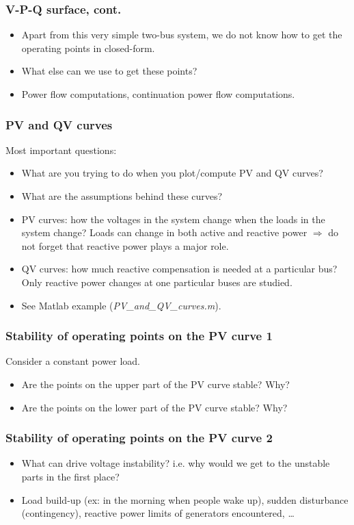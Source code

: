 \documentclass{beamer}
\newlength\fheight
\newlength\fwidth
\begin{document}
\begin{frame}
  \frametitle{V-P-Q surface, cont.}
  \begin{itemize}
  \item Apart from this very simple two-bus system, we do not know how to get the operating points in closed-form. 
  \item What else can we use to get these points?
  \item<visible@2-> Power flow computations, continuation power flow computations.
  \end{itemize}
\end{frame}

\begin{frame}
  \frametitle{PV and QV curves}
Most important questions: 
\begin{itemize}[<visible@+->]
\item What are you trying to do when you plot/compute PV and QV curves?  
\item What are the assumptions behind these curves?
\item PV curves: how the voltages in the system change when the loads in the system change? Loads can change in both active and reactive power $\Rightarrow$ do not forget that reactive power plays a major role.
\item QV curves: how much reactive compensation is needed at a particular bus? Only reactive power changes at one particular buses are studied.
\item See Matlab example (\emph{PV\_and\_QV\_curves.m}).
\end{itemize}
\end{frame}

\begin{frame}
\frametitle{Stability of operating points on the PV curve 1}
  \setlength\fheight{0.3\textheight} 
\setlength{}


Consider a constant power load.
\begin{itemize}
\item Are the points on the upper part of the PV curve stable? Why?
\item Are the points on the lower part of the PV curve stable? Why?
\end{itemize}
\end{frame}

\begin{frame}
\frametitle{Stability of operating points on the PV curve 2}
\setlength\fheight{0.3\textheight} 
\setlength{}

\begin{itemize}[<visible@+->]
\item What can drive voltage instability? i.e. why would we get to the unstable parts in the first place?
\item Load build-up (ex: in the morning when people wake up), sudden disturbance (contingency), reactive power limits of generators encountered, \ldots
\end{itemize} 
\end{frame}
\end{document}

